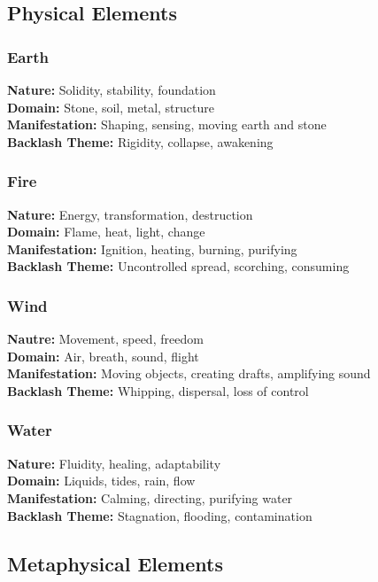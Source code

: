 \documentclass[11pt]{report}
\begin{document}
\subsection{Physical Elements}

\subsubsection{Earth}
\textbf{Nature:} Solidity, stability, foundation\\
\textbf{Domain:} Stone, soil, metal, structure\\
\textbf{Manifestation:} Shaping, sensing, moving earth and stone\\
\textbf{Backlash Theme:} Rigidity, collapse, awakening

\subsubsection{Fire}
\textbf{Nature:} Energy, transformation, destruction\\
\textbf{Domain:} Flame, heat, light, change\\
\textbf{Manifestation:} Ignition, heating, burning, purifying\\
\textbf{Backlash Theme:} Uncontrolled spread, scorching, consuming

\subsubsection{Wind}
\textbf{Nautre:} Movement, speed, freedom\\
\textbf{Domain:} Air, breath, sound, flight\\
\textbf{Manifestation:} Moving objects, creating drafts, amplifying sound\\
\textbf{Backlash Theme:} Whipping, dispersal, loss of control

\subsubsection{Water}
\textbf{Nature:} Fluidity, healing, adaptability\\
\textbf{Domain:} Liquids, tides, rain, flow\\
\textbf{Manifestation:} Calming, directing, purifying water\\
\textbf{Backlash Theme:} Stagnation, flooding, contamination

\subsection{Metaphysical Elements}
\end{document}
